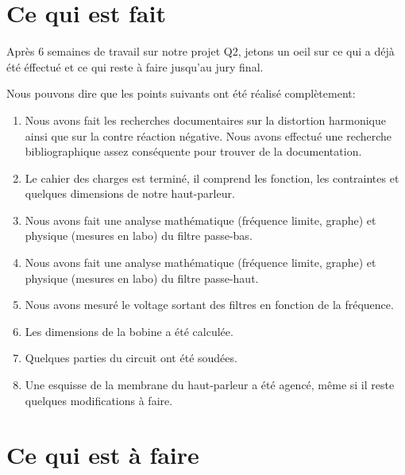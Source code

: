 

\section{Ce qui est fait}
Après 6 semaines de travail sur notre projet Q2, jetons un oeil sur ce qui a déjà été éffectué et ce qui reste à faire jusqu'au jury final.

Nous pouvons dire que les points suivants ont été réalisé complètement:
\\
\begin{enumerate}
\item Nous avons fait les recherches documentaires sur la distortion harmonique ainsi que sur la contre réaction négative.
Nous avons effectué une recherche bibliographique assez conséquente pour trouver de la documentation.
\item Le cahier des charges est terminé, il comprend les fonction, les contraintes et quelques dimensions de notre haut-parleur.
\item Nous avons fait une analyse mathématique (fréquence limite, graphe) et physique (mesures en labo) du filtre passe-bas. 
\item Nous avons fait une analyse mathématique (fréquence limite, graphe) et physique (mesures en labo) du filtre passe-haut.
\item Nous avons mesuré le voltage sortant des filtres en fonction de la fréquence.
\item Les dimensions de la bobine a été calculée.
\item Quelques parties du circuit ont été soudées.
\item Une esquisse de la membrane du haut-parleur a été agencé, même si il reste quelques modifications à faire.
\end{enumerate}

\section{Ce qui est à faire}

